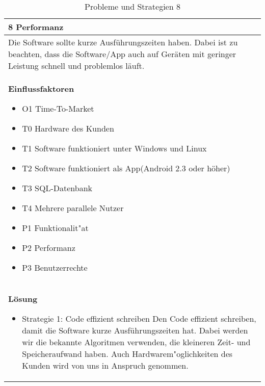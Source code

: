 \begin{table}[H]
\caption{Probleme und Strategien 8}
\begin{tabular}{|p{\textwidth}|}\hline
8 Performanz\\ \hline
Die Software sollte kurze Ausführungszeiten haben. Dabei ist zu beachten, dass die Software/App auch auf Geräten mit geringer Leistung schnell und problemlos läuft.\\ \hline
\textbf{Einflussfaktoren}
\begin{itemize}
\item O1 Time-To-Market
\item T0 Hardware des Kunden
\item T1 Software funktioniert unter Windows und Linux
\item T2 Software funktioniert als App(Android 2.3 oder höher)
\item T3 SQL-Datenbank
\item T4 Mehrere parallele Nutzer
\item P1 Funktionalit"at
\item P2 Performanz
\item P3 Benutzerrechte
\end{itemize}\\ \hline
\textbf{Lösung}
\begin{itemize}
\item Strategie 1: Code effizient schreiben \leavevmode\newline
Den Code effizient schreiben, damit die Software kurze Ausführungszeiten hat. Dabei werden wir die bekannte Algoritmen verwenden, die kleineren Zeit- und Speicheraufwand haben. Auch Hardwarem"oglichkeiten des Kunden wird von uns in Anspruch genommen.
\end{itemize}\\ \hline
\end{tabular}
\end{table}

